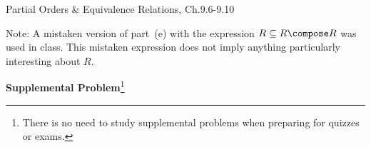 \documentclass[handout]{mcs}
\begin{document}

\begin{staffnotes}
Partial Orders \& Equivalence Relations, Ch.9.6-9.10
\end{staffnotes}



 Note: A mistaken version
of part~(e) with the expression $R \subseteq R \compose R$ was used in
class.  This mistaken expression does not imply anything particularly
interesting about $R$.




\begin{center}
\textbf{Supplemental Problem}\footnote{There is no need to study supplemental
  problems when preparing for quizzes or exams.}
\end{center}



\end{document}
